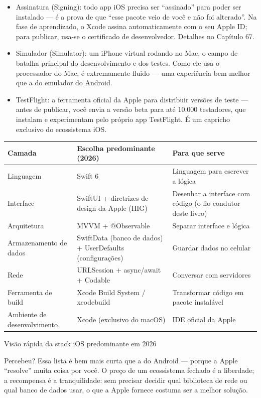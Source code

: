 \begin{itemize}
  \item Assinatura (Signing): todo app iOS precisa ser “assinado” para poder ser instalado — é a prova de que “esse pacote veio de você e não foi alterado”. Na fase de aprendizado, o Xcode assina automaticamente com o seu Apple ID; para publicar, usa-se o certificado de desenvolvedor. Detalhes no Capítulo 67.
  \item Simulador (Simulator): um iPhone virtual rodando no Mac, o campo de batalha principal do desenvolvimento e dos testes. Como ele usa o processador do Mac, é extremamente fluido — uma experiência bem melhor que a do emulador do Android.
  \item TestFlight: a ferramenta oficial da Apple para distribuir versões de teste — antes de publicar, você envia a versão beta para até 10.000 testadores, que instalam e experimentam pelo próprio app TestFlight. É um capricho exclusivo do ecossistema iOS.
\end{itemize}


\begin{center}
\begin{tabularx}{\linewidth}{|X|X|X|}
\hline
\textbf{Camada} & \textbf{Escolha predominante (2026)} & \textbf{Para que serve} \tabularnewline
\hline
Linguagem & Swift 6 & Linguagem para escrever a lógica \tabularnewline
Interface & SwiftUI + diretrizes de design da Apple (HIG) & Desenhar a interface com código (o fio condutor deste livro) \tabularnewline
Arquitetura & MVVM + @Observable & Separar interface e lógica \tabularnewline
Armazenamento de dados & SwiftData (banco de dados) + UserDefaults (configurações) & Guardar dados no celular \tabularnewline
Rede & URLSession + async/await + Codable & Conversar com servidores \tabularnewline
Ferramenta de build & Xcode Build System / xcodebuild & Transformar código em pacote instalável \tabularnewline
Ambiente de desenvolvimento & Xcode (exclusivo do macOS) & IDE oficial da Apple \tabularnewline
\hline
\end{tabularx}
\end{center}

\begin{center}\small\color{gray}Visão rápida da stack iOS predominante em 2026\end{center}

Percebeu? Essa lista é bem mais curta que a do Android — porque a Apple “resolve” muita coisa por você. O preço de um ecossistema fechado é a liberdade; a recompensa é a tranquilidade: sem precisar decidir qual biblioteca de rede ou qual banco de dados usar, o que a Apple fornece costuma ser a melhor solução.


